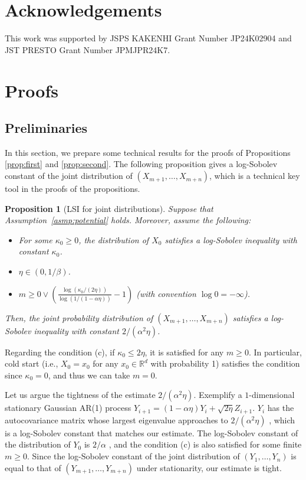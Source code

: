 \documentclass[12pt,reqno]{amsart}
\newtheorem{proposition}[theorem]{Proposition}
\theoremstyle{remark}
\theoremstyle{definition}
\newcommand{\R}{\mathbb{R}}
\begin{document}
\section*{Acknowledgements}
This work was supported by JSPS KAKENHI Grant Number JP24K02904 and JST PRESTO Grant Number JPMJPR24K7.

\appendix
\section{Proofs}\label{app:proof}
\subsection{Preliminaries}
In this section, we prepare some technical results for the proofs of Propositions \ref{prop:first} and \ref{prop:second}.
The following proposition gives a log-Sobolev constant of the joint distribution of $(X_{m+1},\ldots,X_{m+n})$, which is a technical key tool in the proofs of the propositions.
\begin{proposition}[LSI for joint distributions]\label{prop:lsi}
    Suppose that Assumption~\ref{asmp:potential} holds.
    Moreover, assume the following:
    \begin{itemize}
        \item[(a)] For some $\kappa_{0}\ge0$, the distribution of $X_{0}$ satisfies a log-Sobolev inequality with constant $\kappa_{0}$.
        \item[(b)] $\eta\in(0,1/\beta)$.
        \item[(c)] $m\ge 0\vee(\frac{\log(\kappa_{0}/(2\eta))}{\log(1/(1-\alpha\eta))}-1)$ (with convention $\log0=-\infty$).
    \end{itemize}
    Then, the joint probability distribution of $(X_{m+1},\ldots,X_{m+n})$ satisfies a log-Sobolev inequality with constant $2/(\alpha^{2}\eta)$.
\end{proposition}

Regarding the condition (c), if $\kappa_{0}\le 2\eta$, it is satisfied for any $m\ge0$.
In particular, cold start (i.e., $X_{0}=x_{0}$ for any $x_{0}\in\R^{d}$ with probability 1) satisfies the condition since $\kappa_{0}=0$, and thus we can take $m=0$.

Let us argue the tightness of the estimate $2/(\alpha^{2}\eta)$.
Exemplify a $1$-dimensional stationary Gaussian AR(1) process $Y_{i+1}=(1-\alpha\eta)Y_{i}+\sqrt{2\eta}Z_{i+1}$.
$Y_{i}$ has the autocovariance matrix whose largest eigenvalue approaches to $2/(\alpha^{2}\eta)$ \citep[e.g.,][]{sherman2023eigenstructure}, which is a log-Sobolev constant that matches our estimate.
The log-Sobolev constant of the distribution of $Y_{0}$ is $2/\alpha$ \citep[Theorem 8 of][arXiv v4]{vempala2019rapid}, and the condition (c) is also satisfied for some finite $m\ge0$.
Since the log-Sobolev constant of the joint distribution of $(Y_{1},\ldots,Y_{n})$ is equal to that of $(Y_{m+1},\ldots,Y_{m+n})$ under stationarity, our estimate is tight.
\end{document}
